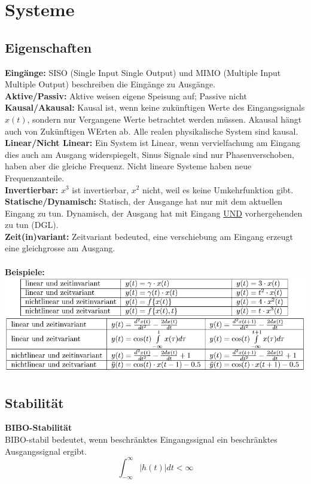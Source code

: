 \section{Systeme}
\subsection{Eigenschaften}
\textbf{Eingänge:} SISO (Single Input Single Output) und MIMO (Multiple Input Multiple Output) beschreiben die Eingänge zu Ausgänge.\\
\textbf{Aktive/Passiv:} Aktive weisen eigene Speisung auf; Passive nicht\\
\textbf{Kausal/Akausal:}  Kausal ist, wenn keine zukünftigen Werte des Eingangssignals $x(t)$, sondern nur Vergangene Werte betrachtet werden müssen. Akausal hängt auch von Zukünftigen WErten ab. Alle realen physikalische System sind kausal.\\
\textbf{Linear/Nicht Linear:}  Ein System ist Linear, wenn vervielfachung am Eingang dies auch am Ausgang widerspiegelt, Sinus Signale sind nur Phasenverschoben, haben aber die gleiche Frequenz. Nicht lineare Systeme haben neue Frequenzanteile.\\
\textbf{Invertierbar:}  $x^3$ ist invertierbar, $x^2$ nicht, weil es keine Umkehrfunktion gibt. \\
\textbf{Statische/Dynamisch:} Statisch, der Ausgange hat nur mit dem aktuellen Eingang zu tun. Dynamisch, der Ausgang hat mit Eingang \underline{UND} vorhergehenden zu tun (DGL).\\
\textbf{Zeit(in)variant:}  Zeitvariant bedeuted, eine verschiebung am Eingang erzeugt eine gleichgrosse am Ausgang.
~\\ ~\\
\textbf{Beispiele:}\\
\includegraphics[width=\columnwidth]{Images/system_beispiele}


\subsection{Stabilität}
\textbf{BIBO-Stabilität}\\
 BIBO-stabil bedeutet, wenn beschränktes Eingangssignal ein beschränktes Ausgangssignal ergibt.
\[
\int_{-\infty}^{\infty}\left|h(t)\right|dt < \infty
\]

